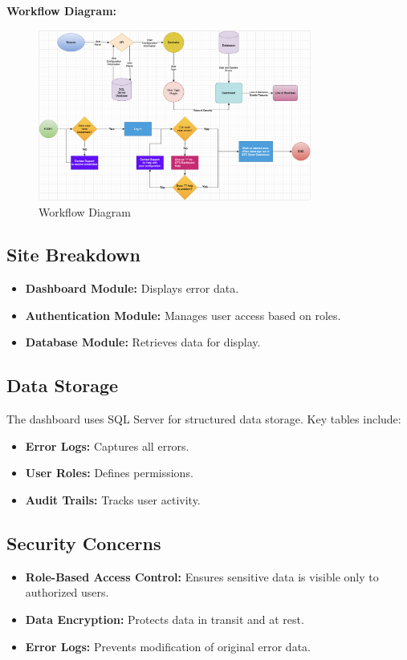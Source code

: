 \documentclass[12pt]{article}
\begin{document}
\textbf{Workflow Diagram:}  
\begin{figure}[h]
    \centering
    \includegraphics[width=0.8\textwidth]{workflowdiagram.png}
    \caption{Workflow Diagram} 
    \label{fig:workflow_diagram}
\end{figure}

\subsection{Site Breakdown}
\begin{itemize}
    \item \textbf{Dashboard Module:} Displays error data.
    \item \textbf{Authentication Module:} Manages user access based on roles.
    \item \textbf{Database Module:} Retrieves data for display.
\end{itemize}

\subsection{Data Storage}
The dashboard uses SQL Server for structured data storage. Key tables include:
\begin{itemize}
    \item \textbf{Error Logs:} Captures all errors.
    \item \textbf{User Roles:} Defines permissions.
    \item \textbf{Audit Trails:} Tracks user activity.
\end{itemize}

\subsection{Security Concerns}
\begin{itemize}
    \item \textbf{Role-Based Access Control:} Ensures sensitive data is visible only to authorized users.
    \item \textbf{Data Encryption:} Protects data in transit and at rest.
    \item \textbf{Error Logs:} Prevents modification of original error data.
\end{itemize}
\end{document}
